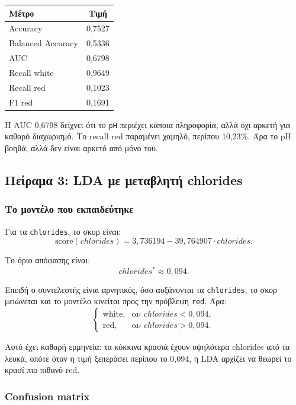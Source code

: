 \documentclass[11pt,a4paper]{article}
\newcommand{\code}[1]{\texttt{#1}}
\begin{document}
\begin{center}
\begin{tabular}{lc}
\toprule
Μέτρο & Τιμή \\
\midrule
Accuracy & 0,7527 \\
Balanced Accuracy & 0,5336 \\
AUC & 0,6798 \\
Recall white & 0,9649 \\
Recall red & 0,1023 \\
F1 red & 0,1691 \\
\bottomrule
\end{tabular}
\end{center}

Η AUC 0,6798 δείχνει ότι το \code{pH} περιέχει κάποια πληροφορία, αλλά όχι
αρκετή για καθαρό διαχωρισμό. Το recall red παραμένει χαμηλό, περίπου 10,23\%.
Άρα το pH βοηθά, αλλά δεν είναι αρκετό από μόνο του.

\subsection{Πείραμα 3: LDA με μεταβλητή chlorides}

\subsubsection{Το μοντέλο που εκπαιδεύτηκε}

Για τα \code{chlorides}, το σκορ είναι:
\[
\text{score}(chlorides) =
3{,}736194 - 39{,}764907 \cdot chlorides.
\]

Το όριο απόφασης είναι:
\[
chlorides^* \approx 0{,}094.
\]

Επειδή ο συντελεστής είναι αρνητικός, όσο αυξάνονται τα \code{chlorides},
το σκορ μειώνεται και το μοντέλο κινείται προς την πρόβλεψη \code{red}.
Άρα:
\[
\begin{cases}
\text{white}, & \text{αν } chlorides < 0{,}094,\\
\text{red}, & \text{αν } chlorides > 0{,}094.
\end{cases}
\]

Αυτό έχει καθαρή ερμηνεία: τα κόκκινα κρασιά έχουν υψηλότερα chlorides από
τα λευκά, οπότε όταν η τιμή ξεπεράσει περίπου το 0,094, η LDA αρχίζει να
θεωρεί το κρασί πιο πιθανό red.

\subsubsection{Confusion matrix}
\end{document}
